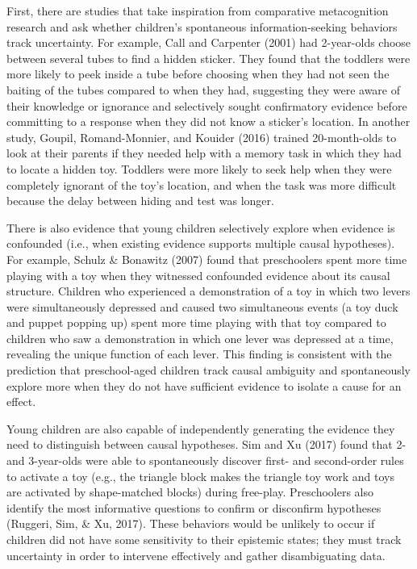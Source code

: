 \documentclass[a4paper,man,apacite,floatsintext]{apa6}
\begin{document}
First, there are studies that take inspiration from comparative
metacognition research and ask whether children's spontaneous
information-seeking behaviors track uncertainty. For example, Call and
Carpenter (2001) had 2-year-olds choose between several tubes to find a
hidden sticker. They found that the toddlers were more likely to peek
inside a tube before choosing when they had not seen the baiting of the
tubes compared to when they had, suggesting they were aware of their
knowledge or ignorance and selectively sought confirmatory evidence
before committing to a response when they did not know a sticker's
location. In another study, Goupil, Romand-Monnier, and Kouider (2016)
trained 20-month-olds to look at their parents if they needed help with
a memory task in which they had to locate a hidden toy. Toddlers were
more likely to seek help when they were completely ignorant of the toy's
location, and when the task was more difficult because the delay between
hiding and test was longer.

There is also evidence that young children selectively explore when
evidence is confounded (i.e., when existing evidence supports multiple
causal hypotheses). For example, Schulz \& Bonawitz (2007) found that
preschoolers spent more time playing with a toy when they witnessed
confounded evidence about its causal structure. Children who experienced
a demonstration of a toy in which two levers were simultaneously
depressed and caused two simultaneous events (a toy duck and puppet
popping up) spent more time playing with that toy compared to children
who saw a demonstration in which one lever was depressed at a time,
revealing the unique function of each lever. This finding is consistent
with the prediction that preschool-aged children track causal ambiguity
and spontaneously explore more when they do not have sufficient evidence
to isolate a cause for an effect.

Young children are also capable of independently generating the evidence
they need to distinguish between causal hypotheses. Sim and Xu (2017)
found that 2- and 3-year-olds were able to spontaneously discover first-
and second-order rules to activate a toy (e.g., the triangle block makes
the triangle toy work and toys are activated by shape-matched blocks)
during free-play. Preschoolers also identify the most informative
questions to confirm or disconfirm hypotheses (Ruggeri, Sim, \& Xu,
2017). These behaviors would be unlikely to occur if children did not
have some sensitivity to their epistemic states; they must track
uncertainty in order to intervene effectively and gather disambiguating
data.
\end{document}

